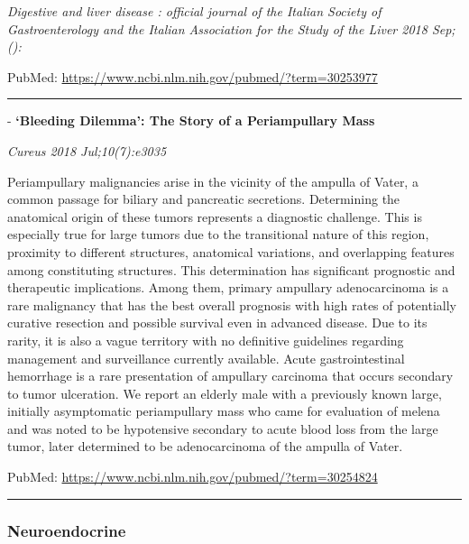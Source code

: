 \documentclass[]{article}
\begin{document}
\emph{Digestive and liver disease : official journal of the Italian
Society of Gastroenterology and the Italian Association for the Study of
the Liver 2018 Sep;():}

PubMed: \url{https://www.ncbi.nlm.nih.gov/pubmed/?term=30253977}

{}

{}

\begin{center}\rule{0.5\linewidth}{\linethickness}\end{center}

 - \textbf{`Bleeding Dilemma': The Story of a Periampullary Mass}

\emph{Cureus 2018 Jul;10(7):e3035}

Periampullary malignancies arise in the vicinity of the ampulla of
Vater, a common passage for biliary and pancreatic secretions.
Determining the anatomical origin of these tumors represents a
diagnostic challenge. This is especially true for large tumors due to
the transitional nature of this region, proximity to different
structures, anatomical variations, and overlapping features among
constituting structures. This determination has significant prognostic
and therapeutic implications. Among them, primary ampullary
adenocarcinoma is a rare malignancy that has the best overall prognosis
with high rates of potentially curative resection and possible survival
even in advanced disease. Due to its rarity, it is also a vague
territory with no definitive guidelines regarding management and
surveillance currently available. Acute gastrointestinal hemorrhage is a
rare presentation of ampullary carcinoma that occurs secondary to tumor
ulceration. We report an elderly male with a previously known large,
initially asymptomatic periampullary mass who came for evaluation of
melena and was noted to be hypotensive secondary to acute blood loss
from the large tumor, later determined to be adenocarcinoma of the
ampulla of Vater.

PubMed: \url{https://www.ncbi.nlm.nih.gov/pubmed/?term=30254824}

{}

{}

\begin{center}\rule{0.5\linewidth}{\linethickness}\end{center}

\hypertarget{neuroendocrine-3}{%
\subsubsection{Neuroendocrine}\label{neuroendocrine-3}}
\end{document}
